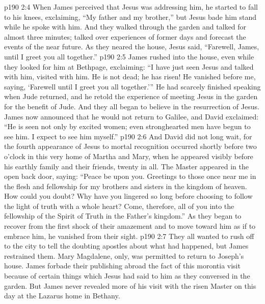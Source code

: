 \vs p190 2:4 When James perceived that Jesus was addressing him, he started to fall to his knees, exclaiming, “My father and my brother,” but Jesus bade him stand while he spoke with him. And they walked through the garden and talked for almost three minutes; talked over experiences of former days and forecast the events of the near future. As they neared the house, Jesus said, \textcolor{ubdarkred}{“Farewell, James, until I greet you all together.”}
\vs p190 2:5 James rushed into the house, even while they looked for him at Bethpage, exclaiming: “I have just seen Jesus and talked with him, visited with him. He is not dead; he has risen! He vanished before me, saying, ‘Farewell until I greet you all together.’” He had scarcely finished speaking when Jude returned, and he retold the experience of meeting Jesus in the garden for the benefit of Jude. And they all began to believe in the resurrection of Jesus. James now announced that he would not return to Galilee, and David exclaimed: “He is seen not only by excited women; even stronghearted men have begun to see him. I expect to see him myself.”
\vs p190 2:6 \pc And David did not long wait, for the fourth appearance of Jesus to mortal recognition occurred shortly before two o’clock in this very home of Martha and Mary, when he appeared visibly before his earthly family and their friends, twenty in all. The Master appeared in the open back door, saying: \textcolor{ubdarkred}{“Peace be upon you. Greetings to those once near me in the flesh and fellowship for my brothers and sisters in the kingdom of heaven. How could you doubt? Why have you lingered so long before choosing to follow the light of truth with a whole heart? Come, therefore, all of you into the fellowship of the Spirit of Truth in the Father’s kingdom.”} As they began to recover from the first shock of their amazement and to move toward him as if to embrace him, he vanished from their sight.
\vs p190 2:7 \pc They all wanted to rush off to the city to tell the doubting apostles about what had happened, but James restrained them. Mary Magdalene, only, was permitted to return to Joseph’s house. James forbade their publishing abroad the fact of this morontia visit because of certain things which Jesus had said to him as they conversed in the garden. But James never revealed more of his visit with the risen Master on this day at the Lazarus home in Bethany.
